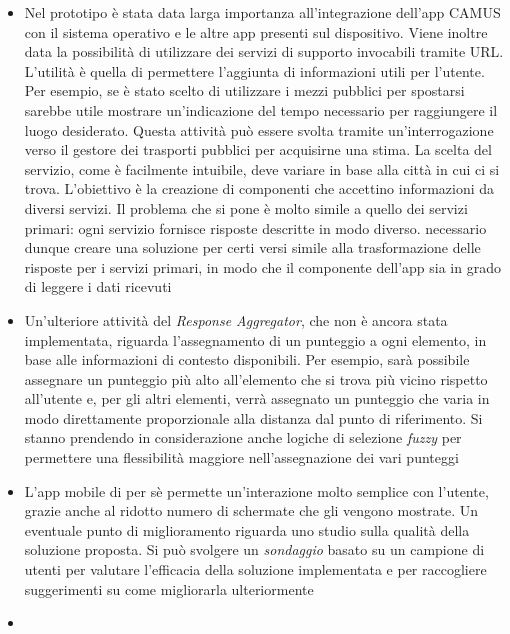 \begin{itemize}
	\item
	Nel prototipo è stata data larga importanza all'integrazione dell'app CAMUS con il sistema operativo e le altre app presenti sul dispositivo. Viene inoltre data la possibilità di utilizzare dei servizi di supporto invocabili tramite URL. L'utilità è quella di permettere l'aggiunta di informazioni utili per l'utente. Per esempio, se è stato scelto di utilizzare i mezzi pubblici per spostarsi sarebbe utile mostrare un'indicazione del tempo necessario per raggiungere il luogo desiderato. Questa attività può essere svolta tramite un'interrogazione verso il gestore dei trasporti pubblici per acquisirne una stima. La scelta del servizio, come è facilmente intuibile, deve variare in base alla città in cui ci si trova. L'obiettivo è la creazione di componenti che accettino informazioni da diversi servizi. Il problema che si pone è molto simile a quello dei servizi primari: ogni servizio fornisce risposte descritte in modo diverso. \upe necessario dunque creare una soluzione per certi versi simile alla trasformazione delle risposte per i servizi primari, in modo che il componente dell'app sia in grado di leggere i dati ricevuti
	\item
	Un’ulteriore attività del \emph{Response Aggregator}, che non è ancora stata implementata, riguarda l’assegnamento di un punteggio a ogni elemento, in base alle informazioni di contesto disponibili. Per esempio, sarà possibile assegnare un punteggio più alto all’elemento che si trova più vicino rispetto all’utente e, per gli altri elementi, verrà assegnato un punteggio che varia in modo direttamente proporzionale alla distanza dal punto di riferimento. Si stanno prendendo in considerazione anche logiche di selezione \emph{fuzzy} per permettere una flessibilità maggiore nell’assegnazione dei vari punteggi
	\item
	L'app mobile di per sè permette un'interazione molto semplice con l'utente, grazie anche al ridotto numero di schermate che gli vengono mostrate. Un eventuale punto di miglioramento riguarda uno studio sulla qualità della soluzione proposta. Si può svolgere un \emph{sondaggio} basato su un campione di utenti per valutare l'efficacia della soluzione implementata e per raccogliere suggerimenti su come migliorarla ulteriormente
	\item

\end{itemize}
